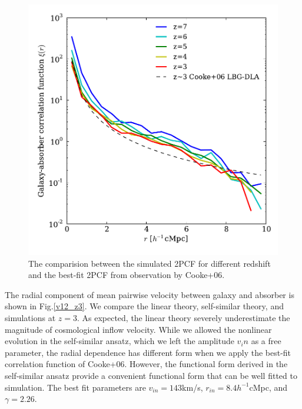 \documentclass[useAMS,usenatbib,twocolumn]{mn2e}
\begin{document}
\begin{figure}
 \begin{center}
  \includegraphics[angle=0,width=\columnwidth]
  {figure/2PCF_L40P256G256R0_Gamma12_SST.pdf}
  \caption{The comparision between the simulated 2PCF for different redshift 
  and the best-fit 2PCF from observation by Cooke+06.}\label{simulated_2PCF}
 \end{center}
\end{figure}

The radial component of mean pairwise velocity between galaxy and absorber
is shown in Fig.\ref{v12_z3}. We compare the linear theory, self-similar
theory, and simulations at $z=3$. As expected, the linear theory severely 
underestimate the magnitude of cosmological inflow velocity. While we allowed
the nonlinear evolution in the self-similar ansatz, which we left
the amplitude $v_in$ as a free parameter, the radial dependence has different
form when we apply the best-fit correlation function of Cooke+06.
However, the functional form derived in the self-similar ansatz provide 
a convenient functional form that can be well fitted to simulation.
The best fit parameters are $v_{in}=143$km/s, $r_{in}=8.4h^{-1}$cMpc, and
$\gamma=2.26$.
\end{document}
